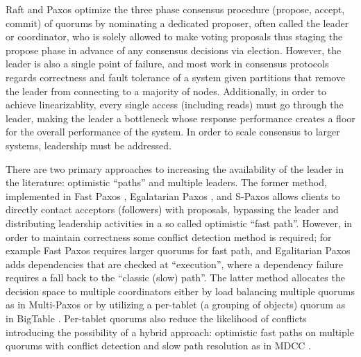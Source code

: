 \documentclass{article}
\begin{document}
Raft and Paxos optimize the three phase consensus procedure (propose, accept, commit) of quorums by nominating a dedicated proposer, often called the leader or coordinator, who is solely allowed to make voting proposals thus staging the propose phase in advance of any consensus decisions via election. However, the leader is also a single point of failure, and most work in consensus protocols regards correctness and fault tolerance of a system given partitions that remove the leader from connecting to a majority of nodes. Additionally, in order to achieve linearizablity, every single access (including reads) must go through the leader, making the leader a bottleneck whose response performance creates a floor for the overall performance of the system. In order to scale consensus to larger systems, leadership must be addressed.

There are two primary approaches to increasing the availability of the leader in the literature: optimistic ``paths'' and multiple leaders. The former method, implemented in Fast Paxos \cite{lamport_fast_2006}, Egalatarian Paxos \cite{moraru_egalitarian_2012}, and S-Paxos \cite{biely_s-paxos:_2012} allows clients to directly contact acceptors (followers) with proposals, bypassing the leader and distributing leadership activities in a so called optimistic ``fast path''. However, in order to maintain correctness some conflict detection method is required; for example Fast Paxos requires larger quorums for fast path, and Egalitarian Paxos adds dependencies that are checked at ``execution'', where a dependency failure requires a fall back to the ``classic (slow) path''. The latter method allocates the decision space to multiple coordinators either by load balancing multiple quorums as in Multi-Paxos \cite{camargos_multicoordinated_2007} or by utilizing a per-tablet (a grouping of objects) quorum as in BigTable \cite{chang_bigtable:_2008}. Per-tablet quorums also reduce the likelihood of conflicts introducing the possibility of a hybrid approach: optimistic fast paths on multiple quorums with conflict detection and slow path resolution as in MDCC \cite{kraska_mdcc:_2013}.
\end{document}
